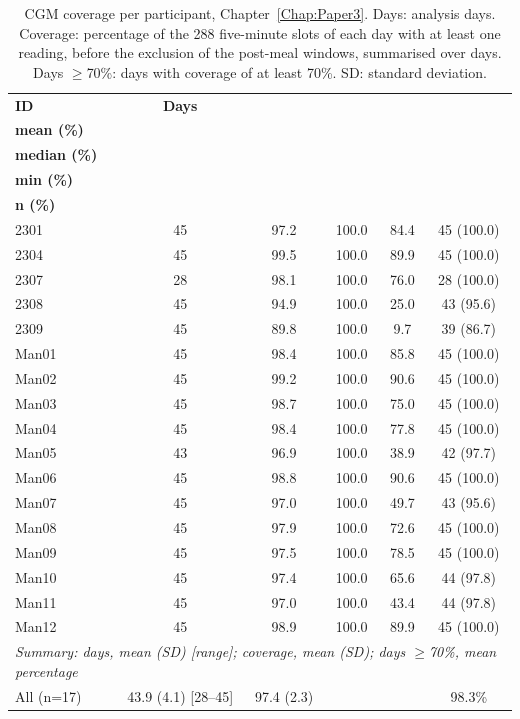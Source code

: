 \begin{table}[htbp]
\centering
\small
\caption{CGM coverage per participant, Chapter~\ref{Chap:Paper3}. Days: analysis days. Coverage: percentage of the 288 five-minute slots of each day with at least one reading, before the exclusion of the post-meal windows, summarised over days. Days $\geq$70\%: days with coverage of at least 70\%. SD: standard deviation.}
\label{tab:P3_CGMCoverage}
\begin{tabular}{|l|c|c|c|c|c|}
\hline
\textbf{ID} & \textbf{Days} & \makecell{\textbf{Coverage}\\\textbf{mean (\%)}} & \makecell{\textbf{Coverage}\\\textbf{median (\%)}} & \makecell{\textbf{Coverage}\\\textbf{min (\%)}} & \makecell{\textbf{Days $\geq$70\%}\\\textbf{n (\%)}} \\
\hline
2301 & 45 & 97.2 & 100.0 & 84.4 & 45 (100.0) \\
2304 & 45 & 99.5 & 100.0 & 89.9 & 45 (100.0) \\
2307 & 28 & 98.1 & 100.0 & 76.0 & 28 (100.0) \\
2308 & 45 & 94.9 & 100.0 & 25.0 & 43 (95.6) \\
2309 & 45 & 89.8 & 100.0 & 9.7 & 39 (86.7) \\
Man01 & 45 & 98.4 & 100.0 & 85.8 & 45 (100.0) \\
Man02 & 45 & 99.2 & 100.0 & 90.6 & 45 (100.0) \\
Man03 & 45 & 98.7 & 100.0 & 75.0 & 45 (100.0) \\
Man04 & 45 & 98.4 & 100.0 & 77.8 & 45 (100.0) \\
Man05 & 43 & 96.9 & 100.0 & 38.9 & 42 (97.7) \\
Man06 & 45 & 98.8 & 100.0 & 90.6 & 45 (100.0) \\
Man07 & 45 & 97.0 & 100.0 & 49.7 & 43 (95.6) \\
Man08 & 45 & 97.9 & 100.0 & 72.6 & 45 (100.0) \\
Man09 & 45 & 97.5 & 100.0 & 78.5 & 45 (100.0) \\
Man10 & 45 & 97.4 & 100.0 & 65.6 & 44 (97.8) \\
Man11 & 45 & 97.0 & 100.0 & 43.4 & 44 (97.8) \\
Man12 & 45 & 98.9 & 100.0 & 89.9 & 45 (100.0) \\
\hline
\multicolumn{6}{|l|}{\textit{Summary: days, mean (SD) [range]; coverage, mean (SD); days $\geq$70\%, mean percentage}} \\
\hline
All (n=17) & 43.9 (4.1) [28--45] & 97.4 (2.3) & & & 98.3\% \\
\hline
\end{tabular}
\end{table}

